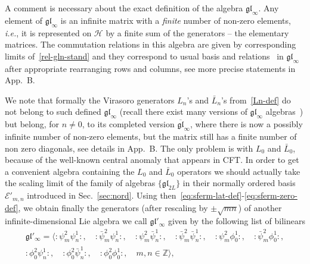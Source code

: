 \documentclass[11pt]{article}
\newcommand{\sfermp}{\psi^{2}}
\newcommand{\sfermm}{\psi^{1}}
\newcommand{\bsfermp}{\bar{\psi}^{2}}
\newcommand{\bsfermm}{\bar{\psi}^{1}}
\newcommand{\phip}{\phi^{2}}
\newcommand{\phim}{\phi^{1}}
\newcommand{\Hilb}{\mathcal{H}}
\newcommand{\oZ}{\mathbb{Z}}
\newcommand{\glinf}{\gl_{\infty}}
\newcommand{\bglinf}{\overline{\gl}_{\infty}}
\newcommand{\glinfc}{\gl'_{\infty}}
\newcommand{\Egl}{\mathcal{E}}
\newcommand{\gl}{\mathfrak{gl}}
\newcommand{\Appglinf}{B}
\newcommand{\nord}[1]{\boldsymbol{\colon}\!\!{#1}\boldsymbol{\colon}\!\!}
\theoremstyle{definition}
\begin{document}
  A comment is necessary about the exact definition of the algebra $\glinf$. Any element of  $\glinf$ is an infinite matrix  with a  \textit{finite} number of non-zero elements,
 {\it i.e.}, it is represented on $\Hilb$ by a finite sum of the generators --  the elementary matrices. The  commutation relations in this algebra are  given by corresponding limits of~\eqref{rel-gln-stand} and they correspond to usual basis and relations~\cite{Kac-book} in $\glinf$ after appropriate rearranging  rows and columns,  see more precise statements in App.~\Appglinf.


  We note that formally the Virasoro generators $L_n$'s and $\bar{L}_n$'s from~\eqref{Ln-def} do not belong to such defined $\glinf$ (recall there exist many versions of $\gl_{\infty}$ algebras~\cite{Kac-book}) but belong, for $n\ne0$, to its completed version $\bglinf$, where there is now
 a possibly infinite number of non-zero elements, but the matrix still has a finite number of non zero diagonals, see details in App.~\Appglinf.
The only problem is with $L_0$ and $\bar{L}_0$, because of  the well-known central anomaly that appears in CFT. In order to get a convenient algebra containing the $L_0$ and $\bar{L}_0$ operators we should actually take the scaling limit of the family of algebras $\{\gl_{2L}\}$ in their normally ordered basis $\Egl'_{m,n}$ introduced in Sec.~\ref{sec:nord}.
 Using then~\eqref{eq:sferm-lat-def}-\eqref{eq:sferm-zero-def},
 we  obtain finally
  the generators (after rescaling by $\pm\sqrt{mn}$) of another infinite-dimensional Lie algebra we call $\glinfc$
  given by the following list of bilinears
\begin{multline}\label{gl-inf-2}
\glinfc =\langle\nord{\sfermp_{m}\sfermm_{n}},\quad \nord{\bsfermp_{m}\sfermm_{n}},\quad \nord{\sfermp_{m}\bsfermm_{n}},\quad \nord{\bsfermp_{m}\bsfermm_{n}},
\quad \nord{\sfermp_{m}\phim_{0}},\quad \nord{\bsfermp_{m}\phim_{0}},\\
  \nord{\phip_0\sfermm_{n}},\quad  \nord{\phip_0\bsfermm_{n}},\quad
 \nord{\phip_{0}\phim_{0}},\quad m,n\in\oZ\rangle,
\end{multline}
\end{document}
